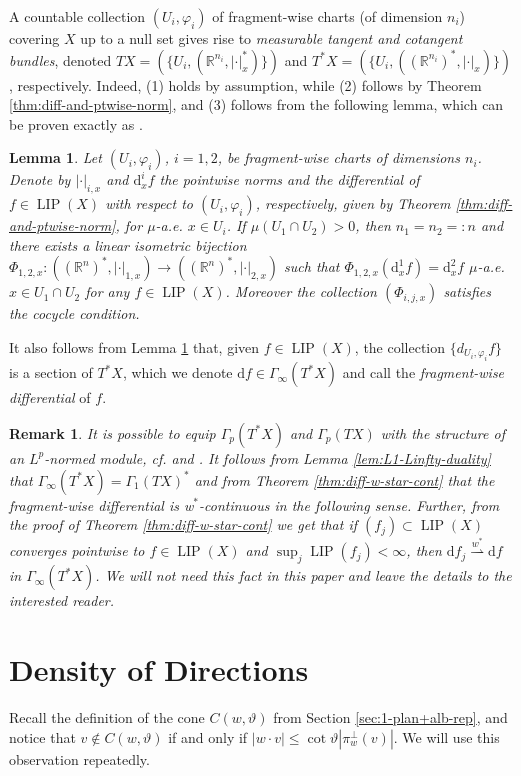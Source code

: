 \documentclass{amsart}
\newtheorem{lemma}[theorem]{Lemma}
\newtheorem{remark}[theorem]{Remark}
\numberwithin{equation}{section}
\newcommand{\R}{\mathbb{R}}
\newcommand{\LIP}{\operatorname{LIP}}
\newcommand{\ud}{\mathrm {d}}
\begin{document}
\bigskip\noindent A countable collection $(U_i,\varphi_i)$ of fragment-wise charts (of dimension $n_i$) covering $X$ up to a null set gives rise to \emph{measurable tangent and cotangent bundles}, denoted $TX=(\{U_i,(\R^{n_i},|\cdot|_x^*)\})$ and $T^*X=(\{U_i,((\R^{n_i})^*,|\cdot|_x)\})$, respectively. Indeed, (1) holds by assumption, while (2) follows by Theorem \ref{thm:diff-and-ptwise-norm}, and (3) follows from the following lemma, which can be proven exactly as \cite[Proposition 5.1 and Lemma 5.2]{teriseb} . 

\begin{lemma}\label{lem:compatible}
Let $(U_i,\varphi_i)$, $i=1,2$, be fragment-wise charts of dimensions $n_i$. Denote by $|\cdot|_{i,x}$ and $\ud_x^if$ the pointwise norms and the differential of $f\in \LIP(X)$ with respect to $(U_i,\varphi_i)$, respectively, given by Theorem \ref{thm:diff-and-ptwise-norm}, for $\mu$-a.e. $x\in U_i$. If $\mu(U_1\cap U_2)>0$, then $n_1=n_2=:n$ and there exists a linear isometric bijection $\Phi_{1,2,x}:((\R^n)^*, |\cdot|_{1,x})\to ((\R^n)^*, |\cdot|_{2,x})$ such that $\displaystyle \Phi_{1,2,x}(\ud_x^1f)=\ud_x^2f$ $\mu$-a.e. $x\in U_1\cap U_2$ for any $f\in \LIP(X)$. Moreover the collection $(\Phi_{i,j,x})$ satisfies the cocycle condition.
\end{lemma}

It also follows from Lemma \ref{lem:compatible} that, given $f\in \LIP(X)$, the collection $\{ d_{U_i,\varphi_i}f\}$ is a section of $T^*X$, which we denote $\ud f\in \Gamma_\infty(T^*X)$ and call the \emph{fragment-wise differential} of $f$.

\begin{remark}\label{rmk:normed module}
It is possible to equip $\Gamma_p(T^*X)$ and $\Gamma_p(TX)$ with the structure of an $L^p$-normed module, cf. \cite[Section 5.2]{teriseb} and \cite{che99}. It follows from Lemma \ref{lem:L1-Linfty-duality} that $\Gamma_\infty(T^*X)=\Gamma_1(TX)^*$ and from Theorem \ref{thm:diff-w-star-cont} that the fragment-wise differential is w$^*$-continuous in the following sense. Further, from the proof of Theorem \ref{thm:diff-w-star-cont} we get that if $(f_j)\subset \LIP(X)$ converges pointwise to $f\in \LIP(X)$ and $\sup_j\LIP(f_j)<\infty$, then $\ud f_j\stackrel{w^*}{\rightharpoonup} \ud f$ in $\Gamma_\infty(T^*X)$. We will not need this fact in this paper and leave the details to the interested reader.
\end{remark}


\section{Density of Directions}\label{sec:dense-dir}
Recall the definition of the cone $C(w,\vartheta)$ from Section \ref{sec:1-plan+alb-rep}, and notice that $v\notin C(w,\vartheta)$ if and only if $|w\cdot v|\le \cot\vartheta|\pi^\perp_w(v)|$. We will use this observation repeatedly.
\end{document}
